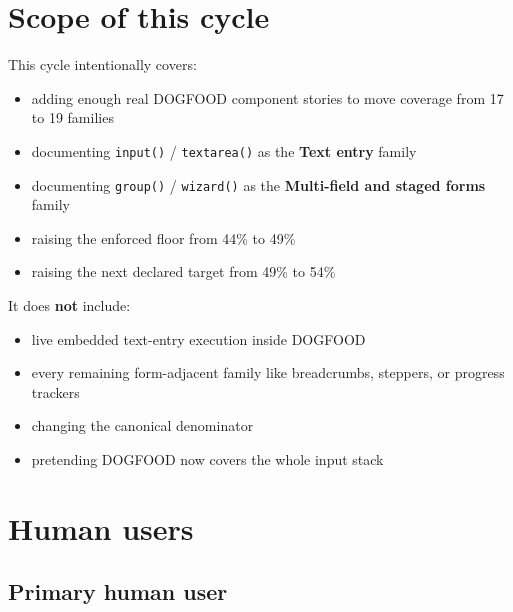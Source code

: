 \section{Scope of this cycle}\label{record-073-scope-of-this-cycle}

This cycle intentionally covers:

\begin{itemize}
\tightlist
\item
  adding enough real DOGFOOD component stories to move coverage from 17 to 19 families
\item
  documenting \texttt{i\allowbreak{}n\allowbreak{}p\allowbreak{}u\allowbreak{}t\allowbreak{}(\allowbreak{})} / \texttt{t\allowbreak{}e\allowbreak{}x\allowbreak{}t\allowbreak{}a\allowbreak{}r\allowbreak{}e\allowbreak{}a\allowbreak{}(\allowbreak{})} as the \textbf{Text entry} family
\item
  documenting \texttt{g\allowbreak{}r\allowbreak{}o\allowbreak{}u\allowbreak{}p\allowbreak{}(\allowbreak{})} / \texttt{w\allowbreak{}i\allowbreak{}z\allowbreak{}a\allowbreak{}r\allowbreak{}d\allowbreak{}(\allowbreak{})} as the \textbf{Multi-field and staged forms} family
\item
  raising the enforced floor from 44\% to 49\%
\item
  raising the next declared target from 49\% to 54\%
\end{itemize}

It does \textbf{not} include:

\begin{itemize}
\tightlist
\item
  live embedded text-entry execution inside DOGFOOD
\item
  every remaining form-adjacent family like breadcrumbs, steppers, or progress trackers
\item
  changing the canonical denominator
\item
  pretending DOGFOOD now covers the whole input stack
\end{itemize}

\section{Human users}\label{record-073-human-users}

\subsection{Primary human user}\label{record-073-primary-human-user}

